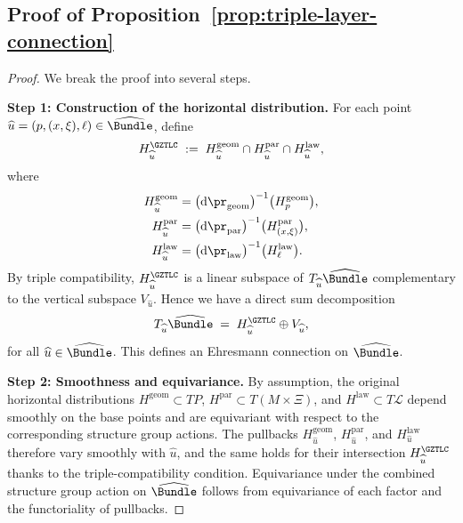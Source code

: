 \documentclass[11pt]{book}
\theoremstyle{plain}
\theoremstyle{definition}
\begin{document}
\subsection*{Proof of Proposition~\ref{prop:triple-layer-connection}}


\begin{proof}
We break the proof into several steps.

\medskip\noindent
\textbf{Step 1: Construction of the horizontal distribution.}
For each point \(\widehat{u}=(p,(x,\xi),\ell)\in\widehat{\Bundle}\),
define
\[
  H^{\GZTLC}_{\widehat{u}}
  \;:=\;
  H_{\widehat{u}}^{\mathrm{geom}}
  \cap
  H_{\widehat{u}}^{\mathrm{par}}
  \cap
  H_{\widehat{u}}^{\mathrm{law}},
\]
where
\begin{align*}
  H_{\widehat{u}}^{\mathrm{geom}}
  &= \bigl(\mathrm{d}\pr_{\mathrm{geom}}\bigr)^{-1}
     \bigl(H^{\mathrm{geom}}_p\bigr),\\
  H_{\widehat{u}}^{\mathrm{par}}
  &= \bigl(\mathrm{d}\pr_{\mathrm{par}}\bigr)^{-1}
     \bigl(H^{\mathrm{par}}_{(x,\xi)}\bigr),\\
  H_{\widehat{u}}^{\mathrm{law}}
  &= \bigl(\mathrm{d}\pr_{\mathrm{law}}\bigr)^{-1}
     \bigl(H^{\mathrm{law}}_{\ell}\bigr).
\end{align*}
By triple compatibility, \(H^{\GZTLC}_{\widehat{u}}\) is a linear
subspace of \(T_{\widehat{u}}\widehat{\Bundle}\) complementary to the
vertical subspace \(V_{\widehat{u}}\).  Hence we have a direct sum
decomposition
\[
  T_{\widehat{u}}\widehat{\Bundle}
  \;=\;
  H^{\GZTLC}_{\widehat{u}}\oplus V_{\widehat{u}},
\]
for all \(\widehat{u}\in\widehat{\Bundle}\).  This defines an Ehresmann
connection on \(\widehat{\Bundle}\).



\medskip\noindent
\textbf{Step 2: Smoothness and equivariance.}
By assumption, the original horizontal distributions
\(H^{\mathrm{geom}}\subset TP\),
\(H^{\mathrm{par}}\subset T(M\times\Xi)\), and
\(H^{\mathrm{law}}\subset T\mathcal{L}\) depend smoothly on the base
points and are equivariant with respect to the corresponding structure
group actions.  The pullbacks
\(H_{\widehat{u}}^{\mathrm{geom}}\),
\(H_{\widehat{u}}^{\mathrm{par}}\), and
\(H_{\widehat{u}}^{\mathrm{law}}\) therefore vary smoothly with
\(\widehat{u}\), and the same holds for their intersection
\(H^{\GZTLC}_{\widehat{u}}\) thanks to the triple-compatibility
condition.  Equivariance under the combined structure group action on
\(\widehat{\Bundle}\) follows from equivariance of each factor and the
functoriality of pullbacks.


\end{proof}
\end{document}
